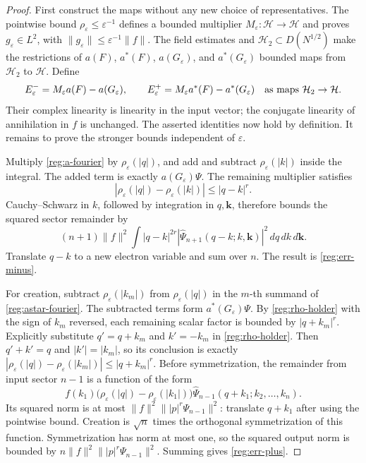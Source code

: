 \documentclass[11pt,a4paper]{article}
\theoremstyle{definition}
\theoremstyle{remark}
\begin{document}
\begin{proof}
First construct the maps without any new choice of representatives.
The pointwise bound $\rho_\varepsilon\leq\varepsilon^{-1}$
defines a bounded multiplier $M_\varepsilon:\mathcal H\to\mathcal H$
and proves $g_\varepsilon\in L^2$, with
$\|g_\varepsilon\|\leq\varepsilon^{-1}\|f\|$.
The field estimates and $\mathcal H_2\subset D(N^{1/2})$ make
the restrictions of $a(F)$, $a^*(F)$, $a(G_\varepsilon)$, and
$a^*(G_\varepsilon)$ bounded maps from $\mathcal H_2$ to
$\mathcal H$. Define
\[
 E^-_\varepsilon
   =M_\varepsilon a(F)-a(G_\varepsilon),\qquad
 E^+_\varepsilon
   =M_\varepsilon a^*(F)-a^*(G_\varepsilon)
       \quad\hbox{as maps }\mathcal H_2\to\mathcal H.
\]
Their complex linearity is linearity in the input vector; the
conjugate linearity of annihilation in $f$ is unchanged.
The asserted identities now hold by definition. It remains to prove
the stronger bounds independent of $\varepsilon$.

Multiply \eqref{reg:a-fourier} by \(\rho_\varepsilon(|q|)\), and add and
subtract \(\rho_\varepsilon(|k|)\) inside the integral.  The added term is
exactly \(a(G_\varepsilon)\Psi\).  The remaining multiplier satisfies
\[
 |\rho_\varepsilon(|q|)-\rho_\varepsilon(|k|)|\leq|q-k|^r.
\]
Cauchy--Schwarz in \(k\), followed by integration in \(q,\mathbf k\),
therefore bounds the squared sector remainder by
\[
 (n+1)\|f\|^2\int |q-k|^{2r}
       |\widehat\Psi_{n+1}(q-k;k,\mathbf k)|^2\,dq\,dk\,d\mathbf k.
\]
Translate \(q-k\) to a new electron variable and sum over \(n\).  The
result is \eqref{reg:err-minus}.

For creation, subtract \(\rho_\varepsilon(|k_m|)\) from
\(\rho_\varepsilon(|q|)\) in the \(m\)-th summand of
\eqref{reg:astar-fourier}.  The subtracted terms form
\(a^*(G_\varepsilon)\Psi\).  By \eqref{reg:rho-holder} with the sign
of \(k_m\) reversed, each remaining scalar factor is bounded by
\(|q+k_m|^r\). Explicitly substitute $q'=q+k_m$ and $k'=-k_m$
in \eqref{reg:rho-holder}. Then $q'+k'=q$ and $|k'|=|k_m|$,
so its conclusion is exactly
$|\rho_\varepsilon(|q|)-\rho_\varepsilon(|k_m|)|\leq|q+k_m|^r$.
Before symmetrization, the remainder from input sector
\(n-1\) is a function of the form
\[
 f(k_1)\bigl(\rho_\varepsilon(|q|)-\rho_\varepsilon(|k_1|)\bigr)
       \widehat\Psi_{n-1}(q+k_1;k_2,\ldots,k_n).
\]
Its squared norm is at most
\(\|f\|^2\||p|^r\Psi_{n-1}\|^2\): translate \(q+k_1\) after using
the pointwise bound.  Creation is \(\sqrt n\) times the orthogonal
symmetrization of this function.  Symmetrization has norm at most one,
so the squared output norm is bounded by
\(n\|f\|^2\||p|^r\Psi_{n-1}\|^2\).  Summing gives
\eqref{reg:err-plus}.


\end{proof}
\end{document}
